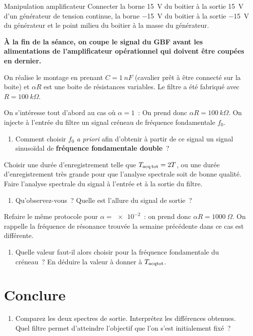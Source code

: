 \documentclass[a4paper, 11pt, final, garamond]{book}
\begin{document}
\begin{instruc}{Manipulation amplificateur}
    Connecter la borne \SI{+15}{V} du boitier à la sortie \SI{+15}{V} d'un
    générateur de tension continue, la borne \SI{-15}{V} du boitier à la sortie
    \SI{-15}{V} du générateur et le point milieu du boitier à la masse du
    générateur.
\end{instruc}

\begin{bror}{}
    \centering\bfseries
    À la fin de la séance, on coupe le signal du GBF avant les alimentations de
    l'amplificateur opérationnel qui doivent être coupées en dernier.
\end{bror}

On réalise le montage en prenant $C=\SI{1}{nF}$ (cavalier prêt à être connecté
sur la boite) et $\alpha R$ est une boite de résistances variables. Le filtre a
été fabriqué avec $R= \SI{100}{k\Omega}$. \bigbreak

On s'intéresse tout d'abord au cas où $\alpha= 1$~: On prend donc $\alpha R =
\SI{100}{k\Omega}$. On injecte à l'entrée du filtre un signal créneau de
fréquence fondamentale $f_0$. \bigbreak

\begin{enumerate}[resume, label=\sqenumi]
    \item Comment choisir $f_0$ \textit{a priori} afin d'obtenir à partir de ce
        signal un signal sinusoïdal de \textbf{fréquence fondamentale double}~? 
\end{enumerate} \bigbreak

Choisir une durée d'enregistrement telle que $T_{\rm acq\, tot} = 2 T$, ou une
durée d'enregistrement très grande pour que l'analyse spectrale soit de bonne
qualité. Faire l'analyse spectrale du signal à l'entrée et à la sortie du
filtre. \bigbreak

\begin{enumerate}[resume, label=\sqenumi]
    \item Qu'observez-vous~? Quelle est l'allure du signal de sortie~?
\end{enumerate} \bigbreak

Refaire le même protocole pour $\alpha=\num{e-2}$~: on prend donc $\alpha R =
\SI{1000}{\Omega}$. On rappelle la fréquence de résonance trouvée la semaine
précédente dans ce cas est différente. \bigbreak

\begin{enumerate}[resume, label=\sqenumi]
    \item Quelle valeur faut-il alors choisir pour la fréquence fondamentale du
        créneau~? En déduire la valeur à donner à $T_{\rm acq tot}$.
\end{enumerate}

\section{Conclure}

\begin{enumerate}[resume, label=\sqenumi]
    \item Comparez les deux spectres de sortie. Interprétez les différences
        obtenues. Quel filtre permet d'atteindre l'objectif que l'on s'est
        initialement fixé~? 
\end{enumerate}
\end{document}
